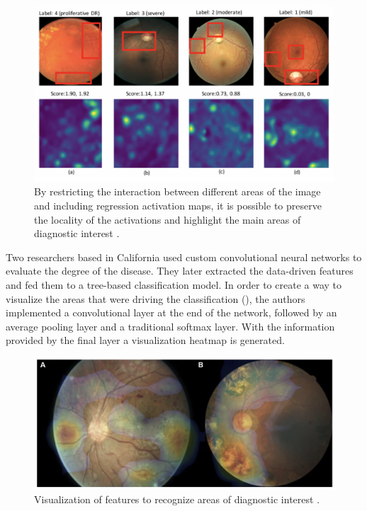\begin{figure}[tb]
    \centering
    \includegraphics[width=\textwidth]{figures/chapter3/interpreted_image.png}
    \caption{By restricting the interaction between different areas of the image and including regression activation maps, it is possible to preserve the locality of the activations and highlight the main areas of diagnostic interest  \cite{wang2017diabetic}.}
    \label{fig:interpreted_image}
\end{figure}

Two researchers based in California \cite{gargeya2017automated} used custom convolutional neural networks to evaluate the degree of the disease. They later extracted the data-driven features and fed them to a tree-based classification model. In order to create a way to visualize the areas that were driving the classification (), the authors implemented a convolutional layer at the end of the network, followed by an average pooling layer and a traditional softmax layer. With the information provided by the final layer a visualization heatmap is generated.

\begin{figure}[tbp]
    \centering
    \includegraphics[width=\textwidth]{figures/chapter3/deep_features.png}
    \caption{Visualization of features to recognize areas of diagnostic interest \cite{gargeya2017automated}.}
    \label{fig:deep_features}
\end{figure}


